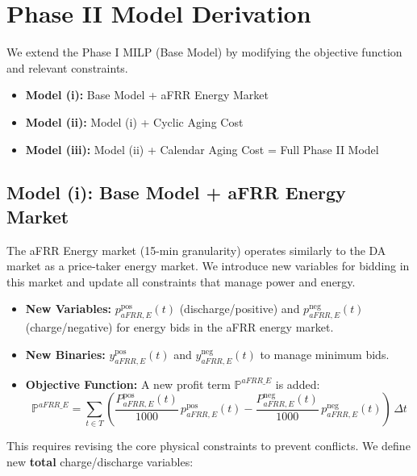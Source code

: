 \documentclass[11pt, a4paper]{article}
\begin{document}
\section{Phase II Model Derivation}
We extend the Phase I MILP (Base Model) by modifying the objective function and relevant constraints.
\begin{itemize}
    \item[√] \textbf{Model (i):} Base Model + aFRR Energy Market
    \item[X] \textbf{Model (ii):} Model (i) + Cyclic Aging Cost
    \item[X] \textbf{Model (iii):} Model (ii) + Calendar Aging Cost = Full Phase II Model  
\end{itemize}

\subsection{Model (i): Base Model + aFRR Energy Market}
The aFRR Energy market (15-min granularity) operates similarly to the DA market as a price-taker energy market. We introduce new variables for bidding in this market and update all constraints that manage power and energy.

\begin{itemize}
    \item \textbf{New Variables:} $p^{\mathrm{pos}}_{aFRR,E}(t)$ (discharge/positive) and $p^{\mathrm{neg}}_{aFRR,E}(t)$ (charge/negative) for energy bids in the aFRR energy market.
    \item \textbf{New Binaries:} $y^{\mathrm{pos}}_{aFRR,E}(t)$ and $y^{\mathrm{neg}}_{aFRR,E}(t)$ to manage minimum bids.
    \item \textbf{Objective Function:} A new profit term $\mathbb{P}^{aFRR\_E}$ is added:
    \begin{equation}
    \mathbb{P}^{aFRR\_E} = \sum_{t\in T} \left( \frac{P^{\mathrm{pos}}_{aFRR, E}(t)}{1000}\, p^{\mathrm{pos}}_{aFRR, E}(t) - \frac{P^{\mathrm{neg}}_{aFRR, E}(t)}{1000}\, p^{\mathrm{neg}}_{aFRR, E}(t) \right)\, \Delta t   
    \end{equation}
    
\end{itemize}

This requires revising the core physical constraints to prevent conflicts. We define new \textbf{total} charge/discharge variables:
\end{document}
